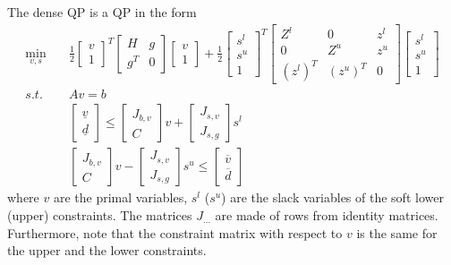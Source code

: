 \documentclass[a4paper]{report}
\begin{document}
The dense QP is a QP in the form
\begin{align*}
\min_{v,s} & \quad \frac 1 2 \begin{bmatrix} v \\ 1 \end{bmatrix}^T \begin{bmatrix} H & g \\ g^T & 0 \end{bmatrix} \begin{bmatrix} v \\ 1 \end{bmatrix} + \frac 1 2 \begin{bmatrix} s^l \\ s^u \\ 1 \end{bmatrix}^T \begin{bmatrix} Z^l & 0 & z^l \\ 0 & Z^u & z^u \\ (z^l)^T & (z^u)^T & 0 \end{bmatrix} \begin{bmatrix} s^l \\ s^u \\ 1 \end{bmatrix} \\
s.t. & \quad A v = b \\
& \quad \begin{bmatrix} \underline v \\ \underline d \end{bmatrix} \leq \begin{bmatrix} J_{b,v} \\ C \end{bmatrix} v + \begin{bmatrix} J_{s,v} \\ J_{s,g} \end{bmatrix} s^l \\
& \quad \begin{bmatrix} J_{b,v} \\ C \end{bmatrix} v - \begin{bmatrix} J_{s,v} \\ J_{s,g} \end{bmatrix} s^u \leq \begin{bmatrix} \overline v \\ \overline d \end{bmatrix}
\end{align*}
where $v$ are the primal variables, $s^l$ ($s^u$) are the slack variables of the soft lower (upper) constraints.
The matrices $J_{\dots}$ are made of rows from identity matrices.
Furthermore, note that the constraint matrix with respect to $v$ is the same for the upper and the lower constraints.
\end{document}
